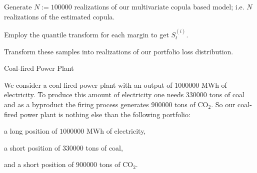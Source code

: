 


	Generate $N:=100000$ realizations of our multivariate copula
based model; i.e. $N$ realizations of the estimated copula.

	Employ the quantile transform for each margin to get $S_t^{(i)}$.

	Transform these samples into realizations of our portfolio
loss distribution.






{Coal-fired Power Plant}

We consider a coal-fired power plant with an output of $1000000$
MWh of electricity. To produce this amount of electricity one
needs $330000$ tons of coal and as a byproduct the firing process
generates $900000$ tons of CO$_2$. So our coal-fired power plant
is nothing else than the following portfolio:

	a long position of $1000000$ MWh of electricity,

	a short position of $330000$ tons of coal,

	and a short position of $900000$ tons of CO$_2$.

